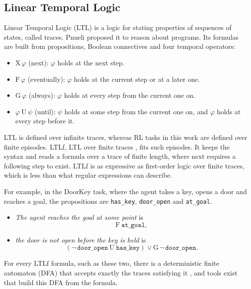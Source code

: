 \documentclass[11pt,english,listoffigures,listoftables]{tfgetsinf}
\begin{document}
\subsection{Linear Temporal Logic}
\label{sec:sota-ltl}
Linear Temporal Logic (LTL) is a logic for stating properties of sequences of states, called traces. Pnueli \cite{pnueli1977temporal} proposed it to reason about programs. Its formulas are built from propositions, Boolean connectives and four temporal operators:
\begin{itemize}
    \item $\mathrm{X}\,\varphi$ (next): $\varphi$ holds at the next step.
    \item $\mathrm{F}\,\varphi$ (eventually): $\varphi$ holds at the current step or at a later one.
    \item $\mathrm{G}\,\varphi$ (always): $\varphi$ holds at every step from the current one on.
    \item $\varphi\ \mathrm{U}\ \psi$ (until): $\psi$ holds at some step from the current one on, and $\varphi$ holds at every step before it.
\end{itemize}
LTL is defined over infinite traces, whereas RL tasks in this work are defined over finite episodes. LTLf, LTL over finite traces \cite{degiacomo2013linear}, fits such episodes. It keeps the syntax and reads a formula over a trace of finite length, where next requires a following step to exist. LTLf is as expressive as first-order logic over finite traces, which is less than what regular expressions can describe.

For example, in the DoorKey task, where the agent takes a key, opens a door and reaches a goal, the propositions are \texttt{has\_key}, \texttt{door\_open} and \texttt{at\_goal}. 

\begin{itemize}
    \item  \textit{The agent reaches the goal at some point} is
    \[ \mathrm{F}\ \texttt{at\_goal}, \]
    \item \textit{the door is not open before the key is held} is
    \[ (\neg\,\texttt{door\_open}\ \mathrm{U}\ \texttt{has\_key}) \lor \mathrm{G}\,\neg\,\texttt{door\_open}. \]
\end{itemize}

For every LTLf formula, such as these two, there is a deterministic finite automaton (DFA) that accepts exactly the traces satisfying it \cite{degiacomo2013linear}, and tools exist that build this DFA from the formula.
\end{document}
